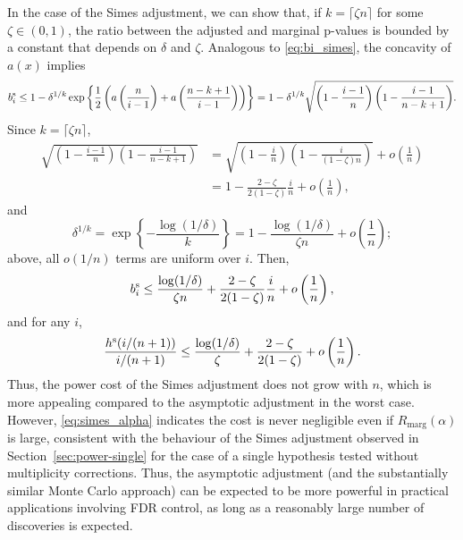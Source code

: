 \documentclass[11pt]{article}
\def\simes{\textnormal{s}}
\begin{document}
In the case of the Simes adjustment, we can show that, if $k = \lceil \zeta n\rceil$ for some $\zeta \in (0, 1)$, the ratio between the adjusted and marginal p-values is bounded by a constant that depends on $\delta$ and $\zeta$. Analogous to \eqref{eq:bi_simes}, the concavity of $a(x)$ implies
\[b_{i}^{\simes} \le 1 - \delta^{1/k}\exp\left\{\frac{1}{2}\left( a\left(\frac{n}{i - 1}\right) +a\left(\frac{n-k+1}{i - 1}\right) \right)\right\} = 1 - \delta^{1/k}\sqrt{\left(1 - \frac{i-1}{n}\right)\left(1 - \frac{i-1}{n-k+1}\right)}.\]
Since $k = \lceil\zeta n\rceil$, 
\begin{align*}
\sqrt{\left(1 - \frac{i-1}{n}\right)\left(1 - \frac{i-1}{n-k+1}\right)} &= \sqrt{\left(1 - \frac{i}{n}\right)\left(1 - \frac{i}{(1-\zeta)n}\right)} + o\left(\frac{1}{n}\right)\\
& = 1 - \frac{2-\zeta}{2(1 - \zeta)}\frac{i}{n} + o\left(\frac{1}{n}\right),
\end{align*}
and
\[\delta^{1/k} = \exp\left\{-\frac{\log(1/\delta)}{k}\right\} = 1 - \frac{\log(1/\delta)}{\zeta n} + o\left(\frac{1}{n}\right);\]
above, all $o(1/n)$ terms are uniform over $i$. 
Then, 
\[b_{i}^\simes \le \frac{\log(1/\delta)}{\zeta n}
 + \frac{2-\zeta}{2(1 - \zeta)}\frac{i}{n}
 + o\left(\frac{1}{n}\right),\]
 and for any $i$,
 \[\frac{h^\simes(i / (n + 1))}{i / (n + 1)} \le \frac{\log(1/\delta)}{\zeta}
 + \frac{2-\zeta}{2(1 - \zeta)} + o\left(\frac{1}{n}\right).\]
Thus, the power cost of the Simes adjustment does not grow with $n$, which is more appealing compared to the asymptotic adjustment in the worst case. However, \eqref{eq:simes_alpha} indicates the cost is never negligible even if $R_{\mathrm{marg}}(\alpha)$ is large, consistent with the behaviour of the Simes adjustment observed in Section~\ref{sec:power-single} for the case of a single hypothesis tested without multiplicity corrections. Thus, the asymptotic adjustment (and the substantially similar Monte Carlo approach) can be expected to be more powerful in practical applications involving FDR control, as long as a reasonably large number of discoveries is expected.
\end{document}
